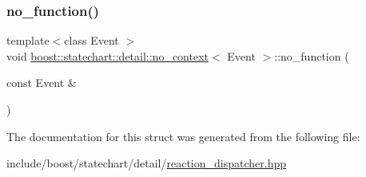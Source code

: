 \subsubsection{\texorpdfstring{no\+\_\+function()}{no\_function()}}
{\footnotesize\ttfamily template$<$class Event $>$ \\
void \mbox{\hyperlink{structboost_1_1statechart_1_1detail_1_1no__context}{boost\+::statechart\+::detail\+::no\+\_\+context}}$<$ Event $>$\+::no\+\_\+function (\begin{DoxyParamCaption}\item[{const Event \&}]{ }\end{DoxyParamCaption})}



The documentation for this struct was generated from the following file\+:\begin{DoxyCompactItemize}
\item 
include/boost/statechart/detail/\mbox{\hyperlink{reaction__dispatcher_8hpp}{reaction\+\_\+dispatcher.\+hpp}}\end{DoxyCompactItemize}
